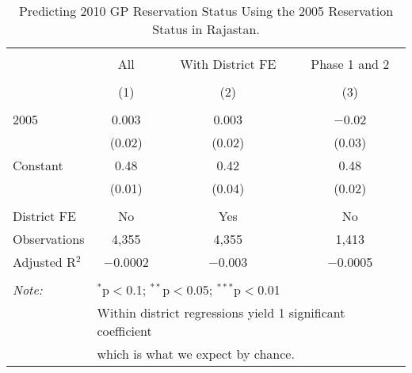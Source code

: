 
\begin{table}[!htbp] \centering 
  \caption{Predicting 2010 GP Reservation Status Using the 2005 Reservation Status in Rajastan.} 
  \label{rand_or_no_raj} 
\begin{tabular}{@{\extracolsep{5pt}}lccc} 
\\[-1.8ex]\hline 
\hline \\[-1.8ex] 
 & All & With District FE & Phase 1 and 2 \\ 
\\[-1.8ex] & (1) & (2) & (3)\\ 
\hline \\[-1.8ex] 
 2005 & 0.003 & 0.003 & $-$0.02 \\ 
  & (0.02) & (0.02) & (0.03) \\ 
  Constant & 0.48 & 0.42 & 0.48 \\ 
  & (0.01) & (0.04) & (0.02) \\ 
 \hline \\[-1.8ex] 
District FE & No & Yes & No \\ 
Observations & 4,355 & 4,355 & 1,413 \\ 
Adjusted R$^{2}$ & $-$0.0002 & $-$0.003 & $-$0.0005 \\ 
\hline 
\hline \\[-1.8ex] 
\textit{Note:}  & \multicolumn{3}{l}{$^{*}$p$<$0.1; $^{**}$p$<$0.05; $^{***}$p$<$0.01} \\ 
 & \multicolumn{3}{l}{Within district regressions yield 1 significant coefficient} \\ 
 & \multicolumn{3}{l}{which is what we expect by chance.} \\ 
\end{tabular} 
\end{table} 
